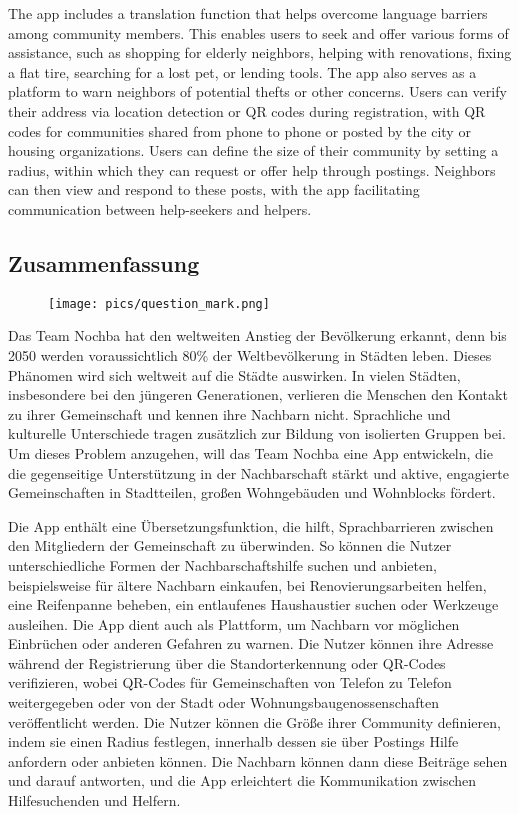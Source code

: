 The app includes a translation function that helps overcome language barriers among community members. This enables users to seek and offer various forms of assistance, such as shopping for elderly neighbors, helping with renovations, fixing a flat tire, searching for a lost pet, or lending tools. The app also serves as a platform to warn neighbors of potential thefts or other concerns. Users can verify their address via location detection or QR codes during registration, with QR codes for communities shared from phone to phone or posted by the city or housing organizations. Users can define the size of their community by setting a radius, within which they can request or offer help through postings. Neighbors can then view and respond to these posts, with the app facilitating communication between help-seekers and helpers.
\newpage
\begin{spacing}{1}
    \chapter*{Zusammenfassung}
\end{spacing}
\begin{wrapfigure}{r}{0.3\textwidth}
    \begin{center}
      \texttt{[image: pics/question\_mark.png]}
    \end{center}
\end{wrapfigure}
Das Team Nochba hat den weltweiten Anstieg der Bevölkerung erkannt, denn bis 2050 werden voraussichtlich 80\% der Weltbevölkerung in Städten leben. Dieses Phänomen wird sich weltweit auf die Städte auswirken. In vielen Städten, insbesondere bei den jüngeren Generationen, verlieren die Menschen den Kontakt zu ihrer Gemeinschaft und kennen ihre Nachbarn nicht. Sprachliche und kulturelle Unterschiede tragen zusätzlich zur Bildung von isolierten Gruppen bei. Um dieses Problem anzugehen, will das Team Nochba eine App entwickeln, die die gegenseitige Unterstützung in der Nachbarschaft stärkt und aktive, engagierte Gemeinschaften in Stadtteilen, großen Wohngebäuden und Wohnblocks fördert.

Die App enthält eine Übersetzungsfunktion, die hilft, Sprachbarrieren zwischen den Mitgliedern der Gemeinschaft zu überwinden. So können die Nutzer unterschiedliche Formen der Nachbarschaftshilfe suchen und anbieten, beispielsweise für ältere Nachbarn einkaufen, bei Renovierungsarbeiten helfen, eine Reifenpanne beheben, ein entlaufenes Haushaustier suchen oder Werkzeuge ausleihen. Die App dient auch als Plattform, um Nachbarn vor möglichen Einbrüchen oder anderen Gefahren zu warnen. Die Nutzer können ihre Adresse während der Registrierung über die Standorterkennung oder QR-Codes verifizieren, wobei QR-Codes für Gemeinschaften von Telefon zu Telefon weitergegeben oder von der Stadt oder Wohnungsbaugenossenschaften veröffentlicht werden. Die Nutzer können die Größe ihrer Community definieren, indem sie einen Radius festlegen, innerhalb dessen sie über Postings Hilfe anfordern oder anbieten können. Die Nachbarn können dann diese Beiträge sehen und darauf antworten, und die App erleichtert die Kommunikation zwischen Hilfesuchenden und Helfern.

